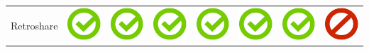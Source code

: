 \documentclass[10pt,foldmark,tumble]{leaflet}
\begin{document}
{{\begin{tabular}{ L{2cm} | C{2cm} | C{2cm} | C{2cm} | C{2cm} | C{2cm} | C{2cm} | C{2cm} | }
Retroshare & \includegraphics[scale=0.1]{pics/haken.png} & \includegraphics[scale=0.1]{pics/haken.png} & \includegraphics[scale=0.1]{pics/haken.png} & \includegraphics[scale=0.1]{pics/haken.png} & \includegraphics[scale=0.1]{pics/haken.png} & \includegraphics[scale=0.1]{pics/haken.png} & \includegraphics[scale=0.1]{pics/nohaken.png} \tabularnewline

\end{tabular}}}
\end{document}
